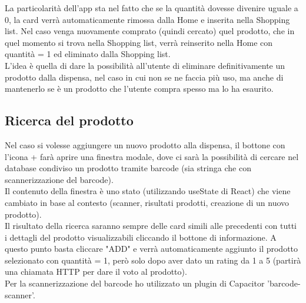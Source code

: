 \documentclass[11pt]{article}
\begin{document}
La particolarità dell'app sta nel fatto che se la quantità dovesse divenire uguale a 0, la card verrà automaticamente rimossa dalla Home e inserita nella Shopping list. Nel caso venga nuovamente comprato (quindi cercato) quel prodotto, che in quel momento si trova nella Shopping list, verrà reinserito nella Home con quantità = 1 ed eliminato dalla Shopping list.\\
L'idea è quella di dare la possibilità all'utente di eliminare definitivamente un prodotto dalla dispensa, nel caso in cui non se ne faccia più uso, ma anche di mantenerlo se è un prodotto che l'utente compra spesso ma lo ha esaurito.


\subsection{Ricerca del prodotto}
Nel caso si volesse aggiungere un nuovo prodotto alla dispensa, il bottone con l'icona + farà aprire una finestra modale, dove ci sarà la possibilità di cercare nel database condiviso un prodotto tramite barcode (sia stringa che con scannerizzazione del barcode).\\
Il contenuto della finestra è uno stato (utilizzando useState di React) che viene cambiato in base al contesto (scanner, risultati prodotti, creazione di un nuovo prodotto).\\
Il risultato della ricerca saranno sempre delle card simili alle precedenti con tutti i dettagli del prodotto visualizzabili cliccando il bottone di informazione.
A questo punto basta cliccare "ADD" e verrà automaticamente aggiunto il prodotto selezionato con quantità = 1, però solo dopo aver dato un rating da 1 a 5 (partirà una chiamata HTTP per dare il voto al prodotto).
\\
Per la scannerizzazione del barcode ho utilizzato un plugin di Capacitor 'barcode-scanner'.
\end{document}

